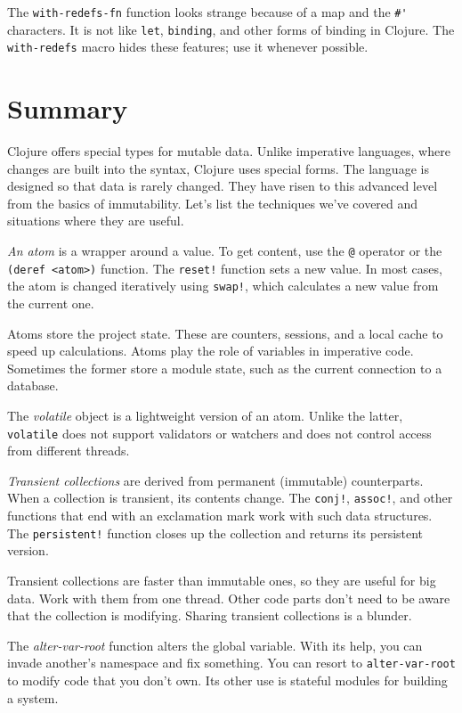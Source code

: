 \fi

The \verb|with-redefs-fn| function looks strange because of a map and the \verb|#'| characters.
It is not like \verb|let|, \verb|binding|, and other forms of binding in Clojure.
The \verb|with-redefs| macro hides these features; use it whenever possible.

\section{Summary}

Clojure offers special types for mutable data.
Unlike imperative languages, where changes are built into the syntax, Clojure uses special forms.
The language is designed so that data is rarely changed.
They have risen to this advanced level from the basics of immutability.
Let's list the techniques we've covered and situations where they are useful.

\emph{An atom} is a wrapper around a value.
To get content, use the \verb|@| operator or the \verb|(deref <atom>)| function.
The \verb|reset!| function sets a new value.
In most cases, the atom is changed iteratively using \verb|swap!|, which calculates a new value from the current one.

Atoms store the project state.
These are counters, sessions, and a local cache to speed up calculations.
Atoms play the role of variables in imperative code. Sometimes the former store a module state, such as the current connection to a database.

The \emph{volatile} object is a lightweight version of an atom.
Unlike the latter, \verb|volatile| does not support validators or watchers and does not control access from different threads.

\emph{Transient collections} are derived from permanent (immutable) counterparts.
When a collection is transient, its contents change.
The \verb|conj!|, \verb|assoc!|, and other functions that end with an exclamation mark work with such data structures.
The \verb|persistent!| function closes up the collection and returns its persistent version.

Transient collections are faster than immutable ones, so they are useful for big data.
Work with them from one thread.
Other code parts don't need to be aware that the collection is modifying.
Sharing transient collections is a blunder.

The \emph{alter-var-root} function alters the global variable.
With its help, you can invade another's namespace and fix something.
You can resort to \verb|alter-var-root| to modify code that you don't own.
Its other use is stateful modules for building a system.

